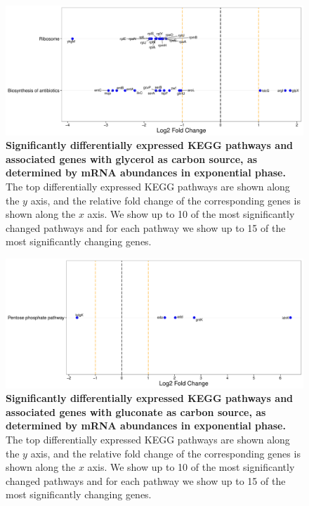 \documentclass[a4paper]{article}
\begin{document}
\clearpage

\begin{figure}[!htb]
	\includegraphics[width=1.0\textwidth]{../../d_figures/kegg_01.pdf}
	\caption[Significantly differentially expressed KEGG pathways for mRNA samples in exponential phase tested for glycerol against glucose]
	{\textbf{Significantly differentially expressed KEGG pathways and associated genes with glycerol as carbon source, as determined by mRNA abundances in exponential phase.} The top differentially expressed KEGG pathways are shown along the $y$ axis, and the relative fold change of the corresponding genes is shown along the $x$ axis. We show up to 10 of the most significantly changed pathways and for each pathway we show up to 15 of the most significantly changing genes.}
\end{figure}

\clearpage
\begin{figure}
	\includegraphics[width=1.0\textwidth]{../../d_figures/kegg_02.pdf}
	\caption[Significantly differentially expressed KEGG pathways for mRNA samples in exponential phase tested for gluconate against glucose]
	{\textbf{Significantly differentially expressed KEGG pathways and associated genes with gluconate as carbon source, as determined by mRNA abundances in exponential phase.} The top differentially expressed KEGG pathways are shown along the $y$ axis, and the relative fold change of the corresponding genes is shown along the $x$ axis. We show up to 10 of the most significantly changed pathways and for each pathway we show up to 15 of the most significantly changing genes.}
\end{figure}
\end{document}
